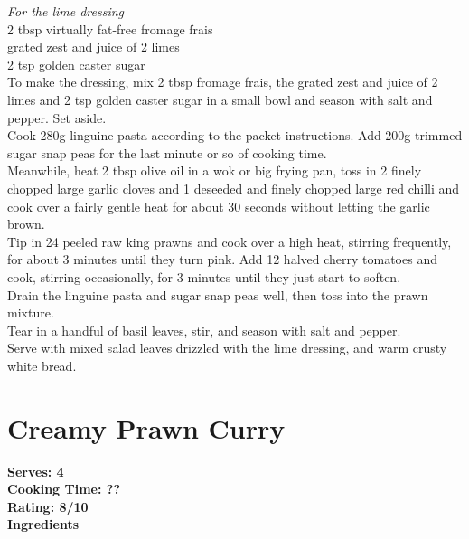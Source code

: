 \documentclass[18pt, oneside]{book}
\begin{document}
\textit{For the lime dressing \\}
2 tbsp virtually fat-free fromage frais \\
grated zest and juice of 2 limes \\
2 tsp golden caster sugar \\

To make the dressing, mix 2 tbsp fromage frais, the grated zest and juice of 2 limes and 2 tsp golden caster sugar in a small bowl and season with salt and pepper. Set aside.\\

Cook 280g linguine pasta according to the packet instructions. Add 200g trimmed sugar snap peas for the last minute or so of cooking time.\\

Meanwhile, heat 2 tbsp olive oil in a wok or big frying pan, toss in 2 finely chopped large garlic cloves and 1 deseeded and finely chopped large red chilli and cook over a fairly gentle heat for about 30 seconds without letting the garlic brown.\\

Tip in 24 peeled raw king prawns and cook over a high heat, stirring frequently, for about 3 minutes until they turn pink.
Add 12 halved cherry tomatoes and cook, stirring occasionally, for 3 minutes until they just start to soften. \\

Drain the linguine pasta and sugar snap peas well, then toss into the prawn mixture.\\

Tear in a handful of basil leaves, stir, and season with salt and pepper.\\

Serve with mixed salad leaves drizzled with the lime dressing, and warm crusty white bread.


\section{Creamy Prawn Curry}

\bf{Serves: 4} \\
\bf{Cooking Time: ??} \\
\bf{Rating: 8/10} \\

\bf{Ingredients} \normalfont \\
\end{document}
